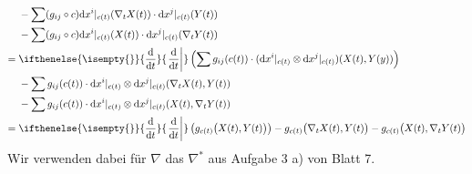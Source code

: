 \documentclass[paper=A4, twoside, chapterprefix=true, bibliography=totoc, headsepline]{scrbook}
\newcommand{\dop}{\mathrm{d}}
\newcommand{\difffrac}[3][]{\ifthenelse{\isempty{#1}}{\frac{\dop #2}{\dop #3}}{\left. \frac{\dop #2}{\dop #3} \right|_{#1}}}
\theoremstyle{plain}
\theoremstyle{nonumberplain}
\theoremstyle{empty}
\theoremstyle{break}
\begin{document}
\begin{description}[font=\normalfont\itshape,leftmargin=*]
\begin{align*}
		 & - \sum (g_{ij} \circ c) \dop x^{i}|_{c(t)} ( \nabla_t X(t)) \cdot \dop x^j|_{c(t)} (Y(t))\\
		 & - \sum (g_{ij} \circ c) \dop x^{i}|_{c(t)} (X(t)) \cdot \dop x^j|_{c(t)} (\nabla_tY(t))\\
		={}& \difffrac{}{t} \left( \sum g_{ij}(c(t)) \cdot (\dop x^{i}|_{c(t)} \otimes \dop x^j|_{c(t)}) (X(t), Y(y)) \right)\\
		 & - \sum g_{ij}(c(t)) \cdot \dop x^{i}|_{c(t)} \otimes \dop x^{j}|_{c(t)} (\nabla_tX(t), Y(t))\\
		 & - \sum g_{ij}(c(t)) \cdot \dop x^{i}|_{c(t)} \otimes \dop x^{j}|_{c(t)} (X(t), \nabla_tY(t))\\
		={}& \difffrac{}{t}\left( g_{c(t)}\big(X(t), Y(t)\big) \right) - g_{c(t)}\big(\nabla_t X(t), Y(t)\big) - g_{c(t)}\big(X(t), \nabla_t Y(t)\big)
	\end{align*}
	Wir verwenden dabei f\"ur $\nabla$ das $\nabla^*$ aus Aufgabe 3 a) von Blatt 7.
\end{description}
\end{document}
